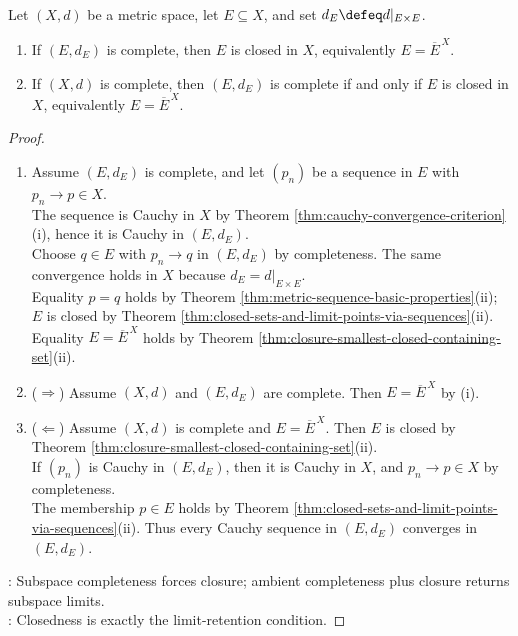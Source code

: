 \begin{proposition} \label{prop:basic-completeness-consequences} \\
Let $(X,d)$ be a metric space, let $E\subseteq X$, and set $d_E\defeq d|_{E\times E}$.
\begin{enumerate}[label=(\roman*)]
\setlength{\itemsep}{0pt}
\item If $(E,d_E)$ is complete, then $E$ is closed in $X$, equivalently $E=\overline{E}^{\,X}$.
\item If $(X,d)$ is complete, then $(E,d_E)$ is complete if and only if $E$ is closed in $X$, equivalently $E=\overline{E}^{\,X}$.
\end{enumerate}
\begin{proof}
\begin{enumerate}[label=(\roman*)]
\setlength{\itemsep}{0pt}
\item[$(i)$] Assume $(E,d_E)$ is complete, and let $(p_n)$ be a sequence in $E$ with $p_n\to p\in X$.\\
The sequence is Cauchy in $X$ by Theorem \ref{thm:cauchy-convergence-criterion}(i), hence it is Cauchy in $(E,d_E)$.\\
Choose $q\in E$ with $p_n\to q$ in $(E,d_E)$ by completeness. The same convergence holds in $X$ because $d_E=d|_{E\times E}$.\\
Equality $p=q$ holds by Theorem \ref{thm:metric-sequence-basic-properties}(ii); $E$ is closed by Theorem \ref{thm:closed-sets-and-limit-points-via-sequences}(ii). Equality $E=\overline{E}^{\,X}$ holds by Theorem \ref{thm:closure-smallest-closed-containing-set}(ii).
\item[$(ii)$] ($\Rightarrow$) Assume $(X,d)$ and $(E,d_E)$ are complete. Then $E=\overline{E}^{\,X}$ by (i).
\item[$(ii)$] ($\Leftarrow$) Assume $(X,d)$ is complete and $E=\overline{E}^{\,X}$. Then $E$ is closed by Theorem \ref{thm:closure-smallest-closed-containing-set}(ii).\\
If $(p_n)$ is Cauchy in $(E,d_E)$, then it is Cauchy in $X$, and $p_n\to p\in X$ by completeness.\\
The membership $p\in E$ holds by Theorem \ref{thm:closed-sets-and-limit-points-via-sequences}(ii). Thus every Cauchy sequence in $(E,d_E)$ converges in $(E,d_E)$.
\end{enumerate}
: Subspace completeness forces closure; ambient completeness plus closure returns subspace limits.\\
: Closedness is exactly the limit-retention condition.
\end{proof}
\end{proposition}

